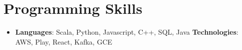 \documentclass[letterpaper,11pt]{article}
\newcommand{\resumeSubHeadingListStart}{\begin{itemize}[leftmargin=*]}
\newcommand{\resumeSubHeadingListEnd}{\end{itemize}}
\begin{document}
%
\section{Programming Skills}
 \resumeSubHeadingListStart
   \item{
     \textbf{Languages}{: Scala, Python, Javascript, C++, SQL, Java}
     \hfill
     \textbf{Technologies}{: AWS, Play, React, Kafka, GCE}
   }
 \resumeSubHeadingListEnd


\end{document}
